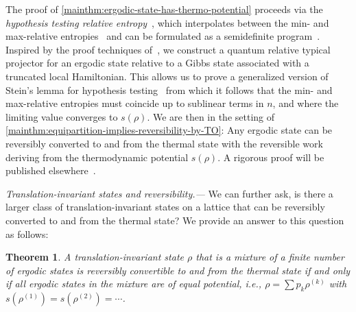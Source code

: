 \documentclass[prl,reprint,longbibliography,superscriptaddress]{revtex4-1}
\newcounter{thm}
\newtheorem{maintheorem}[thm]{Theorem}
\renewcommand\paragraph[1]{%
  \par\emph{#1.---}\kern2pt\relax\ignorespaces}
\begin{document}
The proof of \cref{mainthm:ergodic-state-has-thermo-potential} proceeds via the
\emph{hypothesis testing relative entropy}~\cite{Buscemi2010IEEETIT_capacity,%
  Brandao2011IEEETIT_oneshot,%
  Wang2012PRL_oneshot,%
  Matthews2014IEEETIT_blocklength,%
  Tomamichel2013_hierarchy,%
  Dupuis2013_DH}, which interpolates between the min- and max-relative
entropies~\cite{Dupuis2013_DH} and can be formulated as a semidefinite
program~\cite{Watrous2009_sdps}.  Inspired by the proof techniques of~\cite{%
  Bjelakovic2003arXiv_revisted,%
  Bjelakovic2003arXiv_compression,%
  Bjelakovic2004CMP_ergodic,%
  Bjelakovic2004IM_lattice,%
  Ogata2013LMP_shannonmcmillan}, we construct a quantum relative typical
projector for an ergodic state relative to a Gibbs state associated with a
truncated local Hamiltonian.  This allows us to prove a generalized version of
Stein's lemma for hypothesis testing~\cite{%
  Hiai1991CMP_proper,%
  Ogawa2000IEEETIT_Stein,%
  Bjelakovic2003arXiv_revisted,%
  Bjelakovic2004CMP_ergodic,%
  Brandao2010CMP_Stein} from which it follows that the min- and max-relative
entropies must coincide up to sublinear terms in $n$, and where the limiting
value converges to $s(\rho)$.
%
We are then in the setting of
\cref{mainthm:equipartition-implies-reversibility-by-TO}: Any ergodic state can
be reversibly converted to and from the thermal state with the reversible work
deriving from the thermodynamic potential $s(\rho)$.
%
A rigorous proof will be published elsewhere~\cite{Sagawa-CMP-inprep}.

\paragraph{Translation-invariant states and reversibility}
We can further ask, is there a larger class of translation-invariant states on a
lattice that can be reversibly converted to and from the thermal state?  We
provide an answer to this question as follows:

\begin{maintheorem}
  \label{mainthm:thermo-potential-iff-mix-ergodic-states-eq-potential}
  A translation-invariant state $\rho$ that is a mixture of a finite number of
  ergodic states is reversibly convertible to and from the thermal state if and
  only if all ergodic states in the mixture are of equal potential, i.e.,
  $\rho=\sum p_k \rho^{(k)}$ with $s(\rho^{(1)}) = s(\rho^{(2)}) = \cdots$.
\end{maintheorem}
\end{document}
